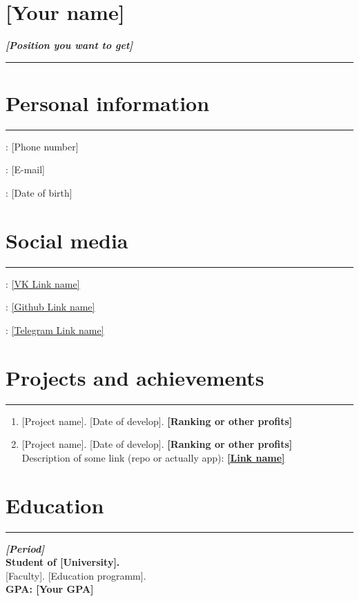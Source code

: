 \documentclass[10pt,a4paper]{report}
\author{[Your name]}
\begin{document}
\section*{[Your name]}
\textsl{\large \textbf{[Position you want to get]}}\\
\hrule height 1pt

\begin{multicols}{2}
\section*{Personal information}
\hrule\bigskip

\faPhone: [Phone number]

\Letter: [E-mail]

\faBirthdayCake: [Date of birth]

\section*{Social media}
\hrule\bigskip

\faVk: \href{http://www.vk.com/[your_vk_id]}{[VK Link name]}

\faGithub: \href{http://www.github.com/[your_github_id]}{[Github Link name]}

\faSend: \href{http://www.t.me/[your_telegram_id]}{[Telegram Link name]}

\end{multicols}


\begin{multicols}{2}

\section*{Projects and achievements}
\hrule\bigskip

\begin{enumerate}

\item {[Project name]. [Date of develop].
		\textbf{[Ranking or other profits]}
}
		
\item {[Project name]. [Date of develop].
		\textbf{[Ranking or other profits]}\\
		Description of some link (repo or actually app):
		\textbf{\href{[Project Link]}{[Link name]}}
}
		
\end{enumerate}

\section*{Education}
\hrule\bigskip

\textbf{\textit{[Period]}}\\
\textbf{Student of [University].\\}
[Faculty]. [Education programm].\\

\textbf{\Large GPA: [Your GPA]}\\

\end{multicols}
\end{document}
